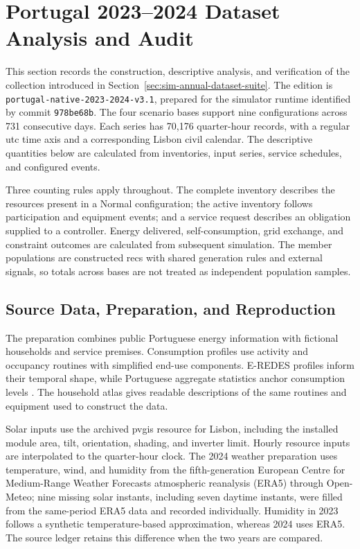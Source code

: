 \section{Portugal 2023--2024 Dataset Analysis and Audit}
\label{app:portugal-current-audit}

This section records the construction, descriptive analysis, and verification of the collection introduced in Section~\ref{sec:sim-annual-dataset-suite}. The edition is \texttt{portugal-native-2023-2024-v3.1}, prepared for the simulator runtime identified by commit \texttt{978be68b}. The four scenario bases support nine configurations across 731 consecutive days. Each series has 70,176 quarter-hour records, with a regular \gls{utc} time axis and a corresponding Lisbon civil calendar. The descriptive quantities below are calculated from inventories, input series, service schedules, and configured events.

Three counting rules apply throughout. The complete inventory describes the resources present in a Normal configuration; the active inventory follows participation and equipment events; and a service request describes an obligation supplied to a controller. Energy delivered, self-consumption, grid exchange, and constraint outcomes are calculated from subsequent simulation. The member populations are constructed \glspl{rec} with shared generation rules and external signals, so totals across bases are not treated as independent population samples.

\subsection{Source Data, Preparation, and Reproduction}

The preparation combines public Portuguese energy information with fictional households and service premises. Consumption profiles use activity and occupancy routines with simplified end-use components. E-REDES profiles inform their temporal shape, while Portuguese aggregate statistics anchor consumption levels \parencite{dgegconsumption2023,pordataconsumption2023}. The household atlas gives readable descriptions of the same routines and equipment used to construct the data.

Solar inputs use the archived \gls{pvgis} resource for Lisbon, including the installed module area, tilt, orientation, shading, and inverter limit. Hourly resource inputs are interpolated to the quarter-hour clock. The 2024 weather preparation uses temperature, wind, and humidity from the fifth-generation European Centre for Medium-Range Weather Forecasts atmospheric reanalysis (ERA5) through Open-Meteo; nine missing solar instants, including seven daytime instants, were filled from the same-period ERA5 data and recorded individually. Humidity in 2023 follows a synthetic temperature-based approximation, whereas 2024 uses ERA5. The source ledger retains this difference when the two years are compared.

